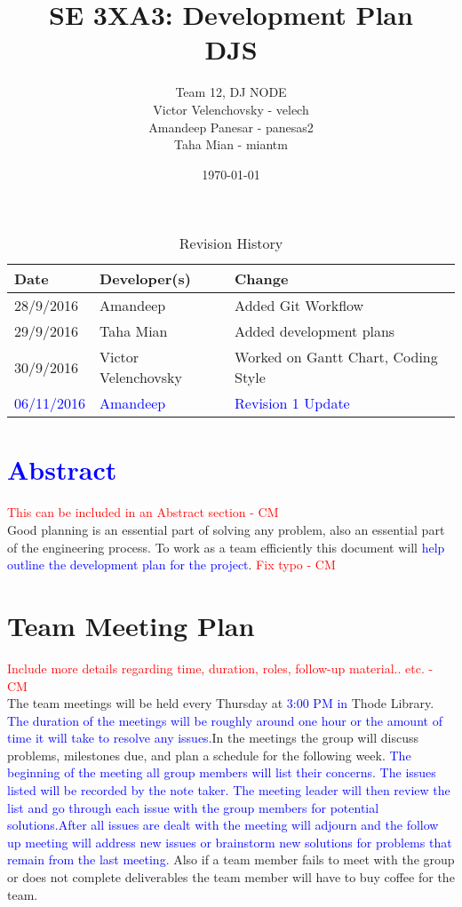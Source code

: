 \documentclass{article}
\title{SE 3XA3: Development Plan\\DJS}
\author{Team 12, DJ NODE
		\\ Victor Velenchovsky - velech
		\\ Amandeep Panesar - panesas2
		\\ Taha Mian - miantm
}
\date{\today}
\begin{document}
\begin{table}[hp]
\caption{Revision History} \label{TblRevisionHistory}
\begin{tabularx}{\textwidth}{llX}
\toprule
\textbf{Date} & \textbf{Developer(s)} & \textbf{Change}\\
\midrule
28/9/2016 & Amandeep & Added Git Workflow\\
29/9/2016 & Taha Mian & Added development plans\\
30/9/2016 & Victor Velenchovsky  & Worked on Gantt Chart, Coding Style\\
\textcolor{blue}{06/11/2016} & \textcolor{blue}{Amandeep} & \textcolor{blue}{Revision 1 Update}\\
\bottomrule
\end{tabularx}
\end{table}

\newpage

\maketitle
\section{\textcolor{blue}{Abstract}}
\textcolor{red}{ This can be included in an Abstract section - CM} \\
Good planning is an essential part of solving any problem, also an essential part of the engineering process. To work as a team efficiently this document will \textcolor{blue}{help outline the development plan for the project}.\textcolor{red}{ Fix typo - CM} 

\section{Team Meeting Plan}
\textcolor{red}{Include more details regarding time, duration, roles, follow-up material.. etc. - CM} \\
The team meetings will be held every Thursday at \textcolor{blue}{3:00 PM in} Thode Library. \textcolor{blue}{The duration of the meetings will be roughly around one hour or the amount of time it will take to resolve any issues.}In the meetings the group will discuss problems, milestones due, and plan a schedule for the following week. \textcolor{blue}{The beginning of the meeting all group members will list their concerns. The issues listed will be recorded by the note taker. The meeting leader will then review the list and go through each issue with the group members for potential solutions.After all issues are dealt with the meeting will adjourn and the follow up meeting will address new issues or brainstorm new solutions for problems that remain from the last meeting.} Also if a team member fails to meet with the group or does not complete deliverables the team member will have to buy coffee for the team.
\end{document}
